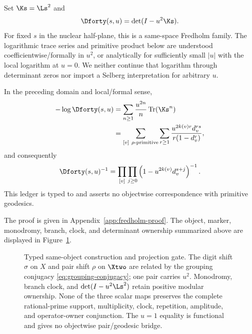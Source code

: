 Set $\Ks=\Ls^2$ and
\begin{equation}
  \Dforty(s,u)=\det(I-u^2\Ks).
  \label{eq:marked-det}
\end{equation}
For fixed $s$ in the nuclear half-plane, this is a same-space Fredholm family.
The logarithmic trace series and primitive product below are understood
coefficientwise/formally in $u^2$, or analytically for sufficiently small
$|u|$ with the local logarithm at $u=0$.  We neither continue that logarithm
through determinant zeros nor import a Selberg interpretation for arbitrary
$u$.

\begin{proposition}
\label{prop:pair-fredholm}
In the preceding domain and local/formal sense,
\begin{align}
 -\log\Dforty(s,u)
 &=\sum_{n\ge1}\frac{u^{2n}}{n}\operatorname{Tr}(\Ks^n) \\
 &=\sum_{[v]\ \rho\text{-primitive}}\sum_{r\ge1}
   \frac{u^{2k(v)r}d_v^{rs}}{r(1-d_v^r)},
 \label{eq:pair-trace-series}
\end{align}
and consequently
\begin{equation}
  \Dforty(s,u)^{-1}
  =\prod_{[v]}\prod_{j\ge0}
    \left(1-u^{2k(v)}d_v^{s+j}\right)^{-1}.
  \label{eq:pair-product}
\end{equation}
This ledger is typed to \RhoPrimitive{} and asserts no objectwise
correspondence with primitive geodesics.
\end{proposition}

The proof is given in Appendix~\ref{app:fredholm-proof}.  The object,
marker, monodromy, branch, clock, and determinant ownership summarized above
are displayed in Figure~\ref{fig:object-gate}.

\begin{figure}[t]
  \centering
  \resizebox{\textwidth}{!}{}
  \caption{Typed same-object construction and projection gate.  The digit
  shift $\sigma$ on $X$ and pair shift $\rho$ on $\Xtwo$ are related by the
  grouping conjugacy \eqref{eq:grouping-conjugacy}; one pair carries $u^2$.
  Monodromy, branch clock, and $\det(I-u^2\Ls^2)$ retain positive modular
  ownership.  None of the three scalar maps preserves the complete
  rational-prime support, multiplicity, clock, repetition, amplitude, and
  operator-owner conjunction.  The $u=1$ equality is functional and gives no
  objectwise pair/geodesic bridge.}
  \label{fig:object-gate}
\end{figure}
